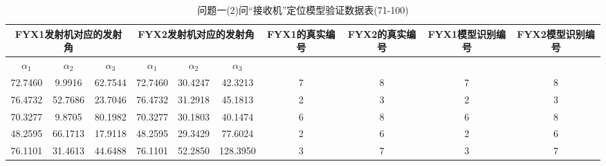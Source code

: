 \documentclass[withoutpreface,bwprint]{cumcmthesis}
\begin{document}
\begin{appendices}
		\begin{table}[htbp!]
			\footnotesize
			\caption{问题一(2)问“接收机”定位模型验证数据表(71-100)}
			\centering
			\tabcolsep=0.1cm
			\begin{tabular}{@{}cccccccccc@{}}
				\toprule
				\multicolumn{3}{c}{\textbf{FYX1发射机对应的发射角}}                                                           & \multicolumn{3}{c}{\textbf{FYX2发射机对应的发射角}}                                                           & \textbf{FYX1的真实编号} & \textbf{FYX2的真实编号} & \textbf{FYX1模型识别编号} & \textbf{FYX2模型识别编号} \\ \midrule
				\multicolumn{1}{c|}{\textbf{$\alpha_{1}$}} & \multicolumn{1}{c|}{\textbf{$\alpha_{2}$}} & \multicolumn{1}{c|}{\textbf{$\alpha_{3}$}} & \multicolumn{1}{c|}{\textbf{$\alpha_{1}$}} & \multicolumn{1}{c|}{\textbf{$\alpha_{2}$}} & \multicolumn{1}{c|}{\textbf{$\alpha_{3}$}} & \multicolumn{4}{c}{\textbf{}}  
				\\ \midrule                                
				72.7460                          & 9.9916                           & 62.7544                          & 72.7460                          & 30.4247                          & 42.3213                          & 7                    & 8                    & 7                      & 8                      \\
				76.4732                          & 52.7686                          & 23.7046                          & 76.4732                          & 31.2918                          & 45.1813                          & 2                    & 3                    & 2                      & 3                      \\
				70.3277                          & 9.8705                           & 80.1982                          & 70.3277                          & 30.1803                          & 40.1474                          & 6                    & 8                    & 6                      & 8                      \\
				48.2595                          & 66.1713                          & 17.9118                          & 48.2595                          & 29.3429                          & 77.6024                          & 2                    & 6                    & 2                      & 6                      \\
				76.1101                          & 31.4613                          & 44.6488                          & 76.1101                          & 52.2850                          & 128.3950                         & 3                    & 7                    & 3                      & 7                      \\

\end{tabular}
\end{table}
\end{appendices}
\end{document}
